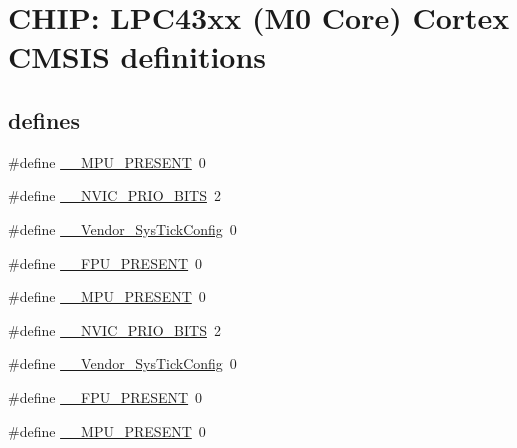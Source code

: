 \hypertarget{group___c_m_s_i_s__43_x_x___m0___c_o_m_m_o_n}{}\section{C\+H\+IP\+: L\+P\+C43xx (M0 Core) Cortex C\+M\+S\+IS definitions}
\label{group___c_m_s_i_s__43_x_x___m0___c_o_m_m_o_n}
\subsection*{\textquotesingle{}defines\textquotesingle{}}
\begin{DoxyCompactItemize}
\item 
\#define \hyperlink{group___c_m_s_i_s__43_x_x___m0___c_o_m_m_o_n_ga4127d1b31aaf336fab3d7329d117f448}{\+\_\+\+\_\+\+M\+P\+U\+\_\+\+P\+R\+E\+S\+E\+NT}~0
\item 
\#define \hyperlink{group___c_m_s_i_s__43_x_x___m0___c_o_m_m_o_n_gae3fe3587d5100c787e02102ce3944460}{\+\_\+\+\_\+\+N\+V\+I\+C\+\_\+\+P\+R\+I\+O\+\_\+\+B\+I\+TS}~2
\item 
\#define \hyperlink{group___c_m_s_i_s__43_x_x___m0___c_o_m_m_o_n_gab58771b4ec03f9bdddc84770f7c95c68}{\+\_\+\+\_\+\+Vendor\+\_\+\+Sys\+Tick\+Config}~0
\item 
\#define \hyperlink{group___c_m_s_i_s__43_x_x___m0___c_o_m_m_o_n_gac1ba8a48ca926bddc88be9bfd7d42641}{\+\_\+\+\_\+\+F\+P\+U\+\_\+\+P\+R\+E\+S\+E\+NT}~0
\item 
\#define \hyperlink{group___c_m_s_i_s__43_x_x___m0___c_o_m_m_o_n_ga4127d1b31aaf336fab3d7329d117f448}{\+\_\+\+\_\+\+M\+P\+U\+\_\+\+P\+R\+E\+S\+E\+NT}~0
\item 
\#define \hyperlink{group___c_m_s_i_s__43_x_x___m0___c_o_m_m_o_n_gae3fe3587d5100c787e02102ce3944460}{\+\_\+\+\_\+\+N\+V\+I\+C\+\_\+\+P\+R\+I\+O\+\_\+\+B\+I\+TS}~2
\item 
\#define \hyperlink{group___c_m_s_i_s__43_x_x___m0___c_o_m_m_o_n_gab58771b4ec03f9bdddc84770f7c95c68}{\+\_\+\+\_\+\+Vendor\+\_\+\+Sys\+Tick\+Config}~0
\item 
\#define \hyperlink{group___c_m_s_i_s__43_x_x___m0___c_o_m_m_o_n_gac1ba8a48ca926bddc88be9bfd7d42641}{\+\_\+\+\_\+\+F\+P\+U\+\_\+\+P\+R\+E\+S\+E\+NT}~0
\item 
\#define \hyperlink{group___c_m_s_i_s__43_x_x___m0___c_o_m_m_o_n_ga4127d1b31aaf336fab3d7329d117f448}{\+\_\+\+\_\+\+M\+P\+U\+\_\+\+P\+R\+E\+S\+E\+NT}~0
\item 

\end{DoxyCompactItemize}
